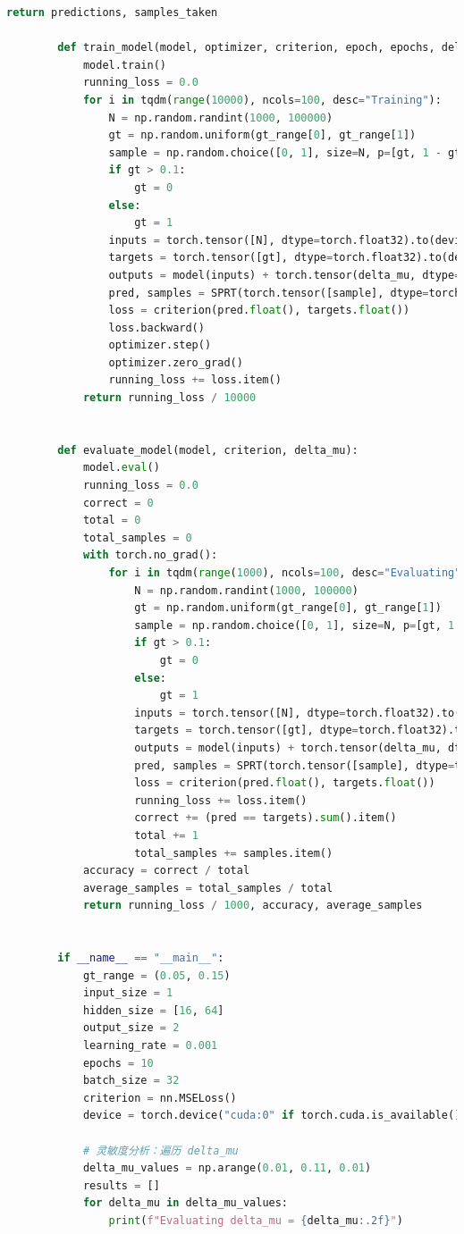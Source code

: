 \documentclass[withoutpreface,bwprint]{cumcmthesis} %
\begin{document}
\begin{appendices}
\begin{lstlisting}[language=python]
			return predictions, samples_taken
		
		def train_model(model, optimizer, criterion, epoch, epochs, delta_mu):
			model.train()
			running_loss = 0.0
			for i in tqdm(range(10000), ncols=100, desc="Training"):
				N = np.random.randint(1000, 100000)
				gt = np.random.uniform(gt_range[0], gt_range[1])
				sample = np.random.choice([0, 1], size=N, p=[gt, 1 - gt])
				if gt > 0.1:
					gt = 0
				else:
					gt = 1
				inputs = torch.tensor([N], dtype=torch.float32).to(device)
				targets = torch.tensor([gt], dtype=torch.float32).to(device)
				outputs = model(inputs) + torch.tensor(delta_mu, dtype=torch.float32).to(device)
				pred, samples = SPRT(torch.tensor([sample], dtype=torch.float32).to(device), outputs)
				loss = criterion(pred.float(), targets.float())
				loss.backward()
				optimizer.step()
				optimizer.zero_grad()
				running_loss += loss.item()
			return running_loss / 10000
		
		
		def evaluate_model(model, criterion, delta_mu):
			model.eval()
			running_loss = 0.0
			correct = 0
			total = 0
			total_samples = 0
			with torch.no_grad():
				for i in tqdm(range(1000), ncols=100, desc="Evaluating"):
					N = np.random.randint(1000, 100000)
					gt = np.random.uniform(gt_range[0], gt_range[1])
					sample = np.random.choice([0, 1], size=N, p=[gt, 1 - gt])
					if gt > 0.1:
						gt = 0
					else:
						gt = 1
					inputs = torch.tensor([N], dtype=torch.float32).to(device)
					targets = torch.tensor([gt], dtype=torch.float32).to(device)
					outputs = model(inputs) + torch.tensor(delta_mu, dtype=torch.float32).to(device)
					pred, samples = SPRT(torch.tensor([sample], dtype=torch.float32).to(device), outputs)
					loss = criterion(pred.float(), targets.float())
					running_loss += loss.item()
					correct += (pred == targets).sum().item()
					total += 1
					total_samples += samples.item()
			accuracy = correct / total
			average_samples = total_samples / total
			return running_loss / 1000, accuracy, average_samples
		
		
		if __name__ == "__main__":
			gt_range = (0.05, 0.15)
			input_size = 1
			hidden_size = [16, 64]
			output_size = 2
			learning_rate = 0.001
			epochs = 10
			batch_size = 32
			criterion = nn.MSELoss()
			device = torch.device("cuda:0" if torch.cuda.is_available() else "cpu")
		
			# 灵敏度分析：遍历 delta_mu
			delta_mu_values = np.arange(0.01, 0.11, 0.01)  
			results = []
			for delta_mu in delta_mu_values:
				print(f"Evaluating delta_mu = {delta_mu:.2f}")
				

\end{lstlisting}
\end{appendices}
\end{document}
